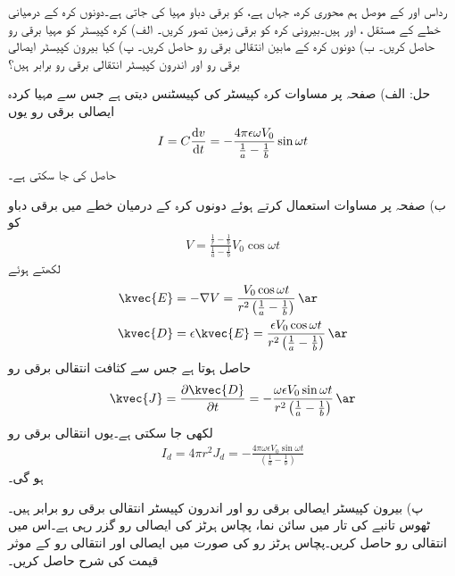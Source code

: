رداس  اور  کے موصل ہم محوری کرہ، جہاں  ہے، کو برقی دباو  مہیا کی جاتی ہے۔دونوں کرہ کے درمیانی خطے کے مستقل ،  اور  ہیں۔بیرونی کرہ کو برقی زمین تصور کریں۔ الف)  کرہ کپیسٹر کو مہیا برقی رو حاصل کریں۔ ب) دونوں کرہ کے مابین انتقالی برقی رو حاصل کریں۔ پ) کیا بیرون کپیسٹر ایصالی برقی رو اور اندرون کپیسٹر انتقالی برقی رو برابر ہیں؟

حل: الف) صفحہ  پر مساوات  کرہ کپیسٹر کی کپیسٹنس دیتی ہے جس سے مہیا کردہ ایصالی برقی رو یوں
\begin{align*}
I=C\frac{\dif v}{\dif t}=-\frac{4\pi\epsilon \omega V_0}{\frac{1}{a}-\frac{1}{b}} \sin \omega t
\end{align*}
حاصل کی جا سکتی ہے۔

ب) صفحہ  پر مساوات  استعمال کرتے ہوئے دونوں کرہ کے درمیان خطے میں برقی دباو کو
\begin{align*}
V=\frac{\frac{1}{r}-\frac{1}{b}}{\frac{1}{a}-\frac{1}{b}} V_0 \cos \omega t
\end{align*}
لکھتے ہوئے 
\begin{align*}
\kvec{E}&=-\nabla V=\frac{V_0 \cos \omega t}{r^2\left(\frac{1}{a}-\frac{1}{b}\right)}  \, \ar\\
\kvec{D}&=\epsilon \kvec{E}=\frac{\epsilon V_0 \cos \omega t}{r^2\left(\frac{1}{a}-\frac{1}{b}\right)} \, \ar
\end{align*}
حاصل ہوتا ہے جس سے کثافت انتقالی برقی رو  
\begin{align*}
\kvec{J}=\frac{\partial \kvec{D}}{\partial t}=-\frac{\omega \epsilon V_0 \sin \omega t}{r^2\left(\frac{1}{a}-\frac{1}{b}\right)} \, \ar
\end{align*}
لکھی جا سکتی ہے۔یوں انتقالی برقی رو
\begin{align*}
I_d=4\pi r^2 J_d=-\frac{4 \pi \omega \epsilon V_0 \sin \omega t}{\left(\frac{1}{a}-\frac{1}{b}\right)} 
\end{align*}
ہو گی۔

پ) بیرون کپیسٹر ایصالی برقی رو اور اندرون کپیسٹر انتقالی برقی رو برابر ہیں۔
ٹھوس تانبے کی تار میں سائن نما، پچاس ہرٹز کی ایصالی رو  گزر رہی ہے۔اس میں انتقالی رو حاصل کریں۔پچاس ہرٹز رو کی صورت میں ایصالی اور انتقالی رو کے موثر قیمت کی شرح حاصل کریں۔

